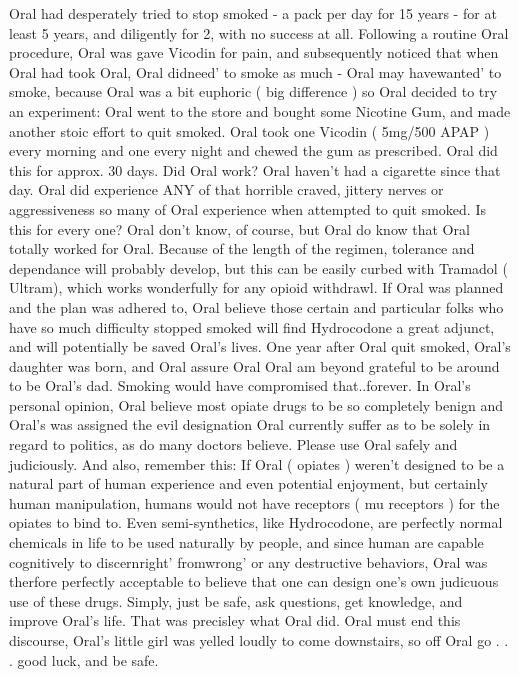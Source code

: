 \documentclass[12pt]{book}
\begin{document}
Oral had desperately tried to stop smoked - a pack per day for 15 years - for at least 5 years, and diligently for 2, with no success at all. Following a routine Oral procedure, Oral was gave Vicodin for pain, and subsequently noticed that when Oral had took Oral, Oral didneed' to smoke as much - Oral may havewanted' to smoke, because Oral was a bit euphoric ( big difference ) so Oral decided to try an experiment: Oral went to the store and bought some Nicotine Gum, and made another stoic effort to quit smoked. Oral took one Vicodin ( 5mg/500 APAP ) every morning and one every night and chewed the gum as prescribed. Oral did this for approx. 30 days. Did Oral work? Oral haven't had a cigarette since that day. Oral did experience ANY of that horrible craved, jittery nerves or aggressiveness so many of Oral experience when attempted to quit smoked. Is this for every one? Oral don't know, of course, but Oral do know that Oral totally worked for Oral. Because of the length of the regimen, tolerance and dependance will probably develop, but this can be easily curbed with Tramadol ( Ultram), which works wonderfully for any opioid withdrawl. If Oral was planned and the plan was adhered to, Oral believe those certain and particular folks who have so much difficulty stopped smoked will find Hydrocodone a great adjunct, and will potentially be saved Oral's lives. One year after Oral quit smoked, Oral's daughter was born, and Oral assure Oral Oral am beyond grateful to be around to be Oral's dad. Smoking would have compromised that..forever. In Oral's personal opinion, Oral believe most opiate drugs to be so completely benign and Oral's was assigned the evil designation Oral currently suffer as to be solely in regard to politics, as do many doctors believe. Please use Oral safely and judiciously. And also, remember this: If Oral ( opiates ) weren't designed to be a natural part of human experience and even potential enjoyment, but certainly human manipulation, humans would not have receptors ( mu receptors ) for the opiates to bind to. Even semi-synthetics, like Hydrocodone, are perfectly normal chemicals in life to be used naturally by people, and since human are capable cognitively to discernright' fromwrong' or any destructive behaviors, Oral was therfore perfectly acceptable to believe that one can design one's own judicuous use of these drugs. Simply, just be safe, ask questions, get knowledge, and improve Oral's life. That was precisley what Oral did. Oral must end this discourse, Oral's little girl was yelled loudly to come downstairs, so off Oral go . . .  good luck, and be safe.
\end{document}
